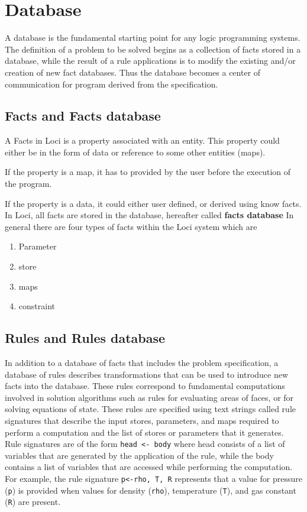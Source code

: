 \chapter { Database}
\par A database is the fundamental starting point for any logic 
programming systems. The definition of a problem to be solved begins as a 
collection of facts stored in a database, while the result of a rule
applications is to modify the existing and/or creation of new fact
databases. Thus the database becomes a center of communication for 
program derived from the specification. 
%
\section { Facts and Facts database }
A Facts in Loci is a property associated with an entity. This property
could either be in the form of data or reference to some other
entities (maps). 

\par If the property is a map, it has to provided by the user before the
execution of the program.

\par If the property is a data, it could either user defined, or derived using
know facts. 
In Loci, all facts are stored in the database, hereafter called {\bf facts database}
In general there are four types of facts within the Loci system which are 

\begin{enumerate}
\item Parameter
\item store
\item maps
\item constraint
\end{enumerate}

\section { Rules and Rules database }
In addition to a database of facts that includes the problem
specification, a database of rules describes transformations that can
be used to introduce new facts into the database. These rules
correspond to fundamental computations involved in solution algorithms
such as rules for evaluating areas of faces, or for solving equations
of state.  These rules are specified using text strings called rule
signatures that describe the input stores, parameters, and maps
required to perform a computation and the list of stores or parameters
that it generates.  Rule signatures are of the form {\tt head <- body}
where head consists of a list of variables that are generated by the
application of the rule, while the body contains a list of variables
that are accessed while performing the computation.  For example, the
rule signature {\tt p<-rho, T, R} represents that a value for pressure
({\tt p}) is provided when values for density ({\tt rho}), temperature
({\tt T}), and gas constant ({\tt R}) are present.

